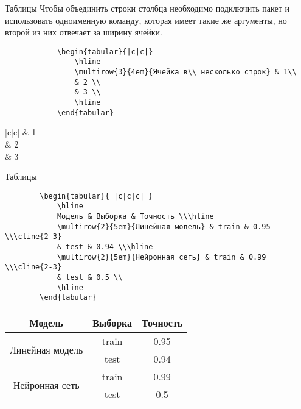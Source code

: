 \begin{frame}[fragile]{Таблицы}
	\small
	Чтобы объединить строки столбца необходимо подключить пакет \texttt{\multirow} и использовать одноименную команду, которая имеет такие же аргументы, но второй из них отвечает за ширину ячейки.   
	
	\begin{minipage}{0.74\textwidth}
		\begin{verbatim}
			\begin{tabular}{|c|c|}
				\hline
				\multirow{3}{4em}{Ячейка в\\ несколько строк} & 1\\
				& 2 \\
				& 3 \\
				\hline
			\end{tabular}
		\end{verbatim}
	\end{minipage}
	\begin{minipage}{0.24\textwidth}
		\begin{center}
			\begin{tabular}{|c|c|}
				\hline
				 & 1\\
				& 2 \\
				& 3 \\
				\hline
			\end{tabular}
		\end{center}
	\end{minipage}
\end{frame}


\begin{frame}[fragile]{Таблицы}
	\small
	\begin{verbatim}
		\begin{tabular}{ |c|c|c| } 
			\hline
			Модель & Выборка & Точность \\\hline
			\multirow{2}{5em}{Линейная модель} & train & 0.95 \\\cline{2-3}
			& test & 0.94 \\\hline 
			\multirow{2}{5em}{Нейронная сеть} & train & 0.99 \\\cline{2-3}
			& test & 0.5 \\ 
			\hline
		\end{tabular}
	\end{verbatim}
	
	\begin{center}
		\begin{tabular}{ |c|c|c| } 
			\hline
			Модель & Выборка & Точность \\\hline
			\multirow{2}{5em}{Линейная модель} & train & 0.95 \\\cline{2-3}
			& test & 0.94 \\\hline 
			\multirow{2}{5em}{Нейронная сеть} & train & 0.99 \\\cline{2-3}
			& test & 0.5 \\ 
			\hline
		\end{tabular}
	\end{center}
\end{frame}


